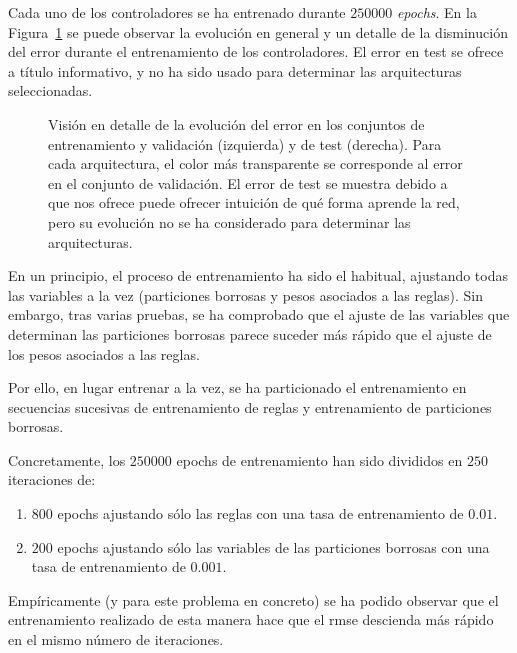 Cada uno de los controladores se ha entrenado durante $250000$ \textit{epochs}. En la Figura~\ref{fig:lm-fcs-rmse-all-comparisons} se puede observar la evolución en general y un detalle de la disminución del error durante el entrenamiento de los controladores. El error en test se ofrece a título informativo, y no ha sido usado para determinar las arquitecturas seleccionadas.

\begin{figure}
	\centering
	\qquad
	\caption[Evolución del error durante el entrenamiento en las arquitecturas de \acrshort{fcs} para el modelo longitudinal]{Visión en detalle de la evolución del error en los conjuntos de entrenamiento y validación (izquierda) y de test (derecha). Para cada arquitectura, el color más transparente se corresponde al error en el conjunto de validación. El error de test se muestra debido a que nos ofrece puede ofrecer intuición de qué forma aprende la red, pero su evolución no se ha considerado para determinar las arquitecturas.}
	\label{fig:lm-fcs-rmse-all-comparisons}
\end{figure}

En un principio, el proceso de entrenamiento ha sido el habitual, ajustando todas las variables a la vez (particiones borrosas y pesos asociados a las reglas). Sin embargo, tras varias pruebas, se ha comprobado que el ajuste de las variables que determinan las particiones borrosas parece suceder más rápido que el ajuste de los pesos asociados a las reglas.

Por ello, en lugar entrenar a la vez, se ha particionado el entrenamiento en secuencias sucesivas de entrenamiento de reglas y entrenamiento de particiones borrosas.

Concretamente, los $250000$ epochs de entrenamiento han sido divididos en $250$ iteraciones de:

\begin{enumerate}
	\item $800$ epochs ajustando sólo las reglas con una tasa de entrenamiento de $0.01$.
	\item $200$ epochs ajustando sólo las variables de las particiones borrosas con una tasa de entrenamiento de $0.001$.
\end{enumerate}

Empíricamente (y para este problema en concreto) se ha podido observar que el entrenamiento realizado de esta manera hace que el \ac{rmse} descienda más rápido en el mismo número de iteraciones.

